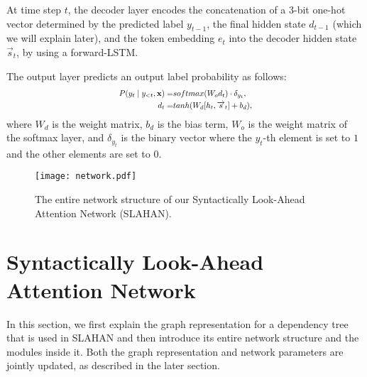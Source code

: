 \documentclass[letterpaper]{article} \usepackage{aaai20}  \usepackage{times}  \usepackage{helvet} \usepackage{courier}  \usepackage[hyphens]{url}  \usepackage{graphicx} \urlstyle{rm} \def\UrlFont{\rm}  \usepackage{graphicx}  \frenchspacing  \setlength{\pdfpagewidth}{8.5in}  \setlength{\pdfpageheight}{11in}  \usepackage{tabu}
\begin{document}
At time step $t$, the decoder layer encodes the concatenation of a 3-bit one-hot vector determined by the predicted label $y_{t-1}$, the final hidden state $d_{t-1}$ (which we will explain later), 
and the token embedding $e_{t}$ into the decoder hidden state $\overrightarrow{s}_{t}$, by using a forward-LSTM.

The output layer predicts an output label probability as follows:
\begin{equation}
    \scalebox{0.8}{$
    \begin{aligned}
    P(y_{t} \mid y_{<t}, \mathbf{x})=& softmax(W_{o} d_{t}) \cdot \delta_{y_{t}},\\
    d_{t} =& tanh(W_{d}[ h_{t}, \overrightarrow{s}_{t} ] + b_{d}),
    \label{eqn:lasth}
    \end{aligned}
    $}
\end{equation}
where $W_{d}$ is the weight matrix, $b_{d}$ is the bias term, $W_{o}$ is the weight matrix of the softmax layer, and $\delta_{y_{t}}$ is the
binary vector where the $y_{t}$-th element is set to $1$ and the other elements are set to $0$.

\begin{figure*}
    \centering
    \texttt{[image: network.pdf]}
    \caption{The entire network structure of our Syntactically Look-Ahead Attention Network (SLAHAN).}
    \label{fig:my_label}
\end{figure*}

\section{Syntactically Look-Ahead Attention Network}
\label{sec:slahan}
In this section, we first explain the graph representation for a dependency tree that is used in SLAHAN and then introduce its entire network structure and the modules inside it.
Both the graph representation and network parameters are jointly updated, as described in the later section.
\end{document}
